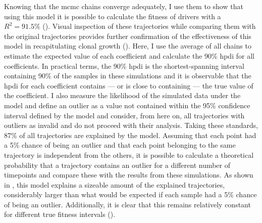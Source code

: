 \begin{figure}[!ht]
	\label{fig:mcmc-chains-sim}
\end{figure}

\begin{figure}[!ht]
	\label{fig:mcmc-ess}
\end{figure}

Knowing that the \ac{mcmc} chains converge adequately, I use them to show that using this model it is possible to calculate the fitness of drivers with a $R^2 = 91.5\%$ (). Visual inspection of these trajectories while comparing them with the original trajectories provides further confirmation of the effectiveness of this model in recapitulating clonal growth (). Here, I use the average of all chains to estimate the expected value of each coefficient and calculate the 90\% \ac{hpdi} for all coefficients. In practical terms, the 90\% \ac{hpdi} is the shortest-spanning interval containing 90\% of the samples in these simulations and it is observable that the \ac{hpdi} for each coefficient contains --- or is close to containing --- the true value of the coefficient. I also measure the likelihood of the simulated data under the model and define an outlier as a value not contained within the 95\% confidence interval defined by the model and consider, from here on, all trajectories with outliers as invalid and do not proceed with their analysis. Taking these standards, 87\% of all trajectories are explained by the model. Assuming that each point had a 5\% chance of being an outlier and that each point belonging to the same trajectory is independent from the others, it is possible to calculate a theoretical probability that a trajectory contains an outlier for a different number of timepoints and compare these with the results from these simulations. As shown in , this model explains a sizeable amount of the explained trajectories, considerably larger than what would be expected if each sample had a 5\% chance of being an outlier. Additionally, it is clear that this remains relatively constant for different true fitness intervals ().

